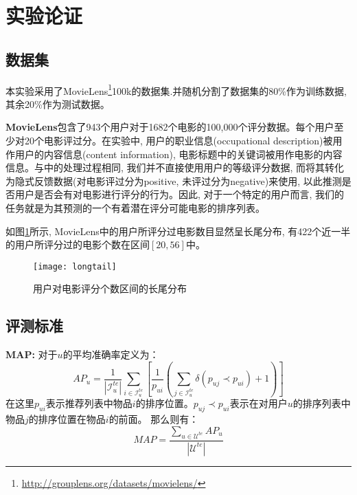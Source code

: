 \section{实验论证}

\subsection{数据集}
本实验采用了MovieLens\footnote{\url{http://grouplens.org/datasets/movielens/}}100k的数据集.并随机分割了数据集的80\%作为训练数据, 其余20\%作为测试数据。

\textbf{MovieLens}包含了943个用户对于1682个电影的100,000个评分数据。每个用户至少对20个电影评过分。在实验中, 用户的职业信息(occupational description)被用作用户的内容信息(content information), 电影标题中的关键词被用作电影的内容信息。与\cite{gunawardana2009unified}中的处理过程相同, 我们并不直接使用用户的等级评分数据, 而将其转化为隐式反馈数据(对电影评过分为positive, 未评过分为negative)来使用, 以此推测是否用户是否会有对电影进行评分的行为。因此, 对于一个特定的用户而言, 我们的任务就是为其预测的一个有着潜在评分可能电影的排序列表。

如图\ref{gra6}所示, MovieLens中的用户所评分过电影数目显然呈长尾分布, 有422个近一半的用户所评分过的电影个数在区间$[20, 56]$中。
\begin{figure}[htbp]
	
	\begin{center}
		\texttt{[image: longtail]}
		\caption{用户对电影评分个数区间的长尾分布}
		\label{gra6}
	\end{center}
\end{figure}

\subsection{评测标准}

\textbf{MAP:} 对于$u$的平均准确率定义为：
\begin{equation*}
AP_u = \frac{1}{|\mathcal{I}_u^{te}|}\sum_{i \in \mathcal{I}_u^{te}}\left[\frac{1}{p_{ui}}\left(\sum_{j \in \mathcal{I}_u^{te}}\delta \left(p_{uj} \prec p_{ui}\right) + 1\right)\right]
\end{equation*}
在这里$p_{ui}$表示推荐列表中物品$i$的排序位置。$p_{uj} \prec p_{ui}$表示在对用户$u$的排序列表中物品$j$的排序位置在物品$i$的前面。
那么则有：
\begin{equation*}
MAP = \frac{\sum_{u \in \mathcal{U}^{te}}AP_u}{|\mathcal{U}^{te}|}
\end{equation*}


